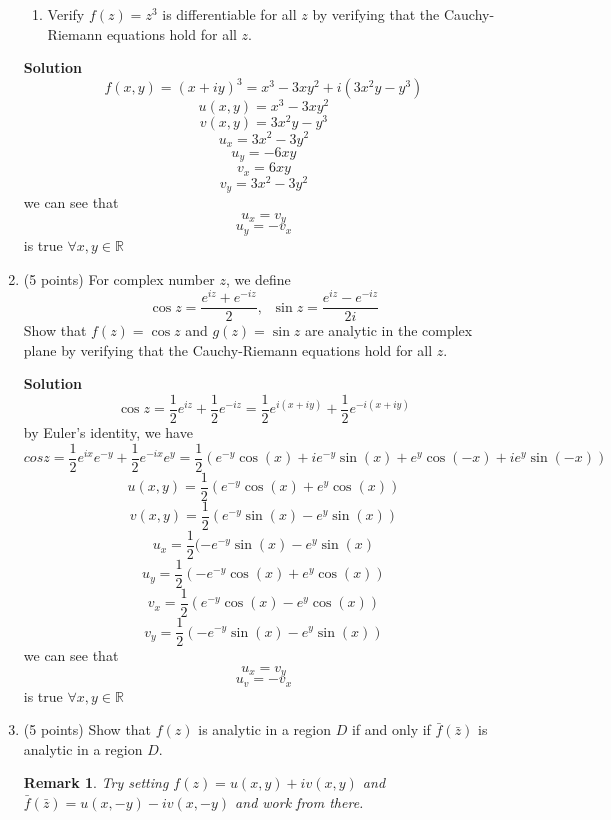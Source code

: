 \documentclass[12pt]{article}
\newtheorem*{remark}{Remark}
\begin{document}
\begin{enumerate}
\begin{enumerate}
    \item Verify $f(z) = z^{3}$ is differentiable for all $z$ by verifying that the Cauchy-Riemann equations hold for all $z$. 
\end{enumerate}
\textbf{Solution}
\[
f(x,y)=(x+iy)^3=x^3 - 3xy^2 + i(3x^2y - y^3)
\]
\[
u(x,y)=x^3-3xy^2
\]
\[
v(x,y)=3x^2y-y^3
\]
\[
u_x=3x^2-3y^2
\]
\[
u_y=-6xy
\]
\[
v_x=6xy
\]
\[
v_y=3x^2-3y^2
\]
we can see that\[
u_x=v_y
\]
\[
u_y=-v_x
\]
is true $\forall x,y\in \mathbb{R}$


\item (5 points) For complex number $z$, we define 
\[
\cos z = \frac{ e^{i z } + e^{-i z} }{2}, \; \; \sin z = \frac{ e^{i z } - e^{-i z } }{2i} 
\]
Show that $f(z) = \cos z$ and $ g(z) = \sin z$ are analytic in the complex plane by verifying that the Cauchy-Riemann equations hold for all $z$.  

\textbf{Solution}
\\
\[
\cos z = \frac{1}{2}e^{iz}+\frac{1}{2}e^{-iz}=\frac{1}{2}e^{i(x+iy)}+\frac{1}{2}e^{-i(x+iy)}
\]
by Euler's identity, we have
\[
cos z=\frac{1}{2}e^{ix}e^{-y}+\frac{1}{2}e^{-ix}e^{y}=\frac{1}{2}(e^{-y}\cos(x)+ie^{-y}\sin(x)+e^{y}\cos(-x)+ie^{y}\sin(-x))
\]
\[
u(x,y)=\frac{1}{2}(e^{-y}\cos(x)+e^{y}\cos(x))
\]
\[
v(x,y)=\frac{1}{2}(e^{-y}\sin(x)-e^{y}\sin(x))
\]
\[
u_x=\frac{1}{2}(-e^{-y}\sin(x)-e^{y}\sin(x)
\]
\[
u_y=\frac{1}{2}(-e^{-y}\cos(x)+e^{y}\cos(x))
\]
\[
v_x=\frac{1}{2}(e^{-y}\cos(x)-e^{y}\cos(x))
\]
\[
v_y=\frac{1}{2}(-e^{-y}\sin(x)-e^{y}\sin(x))
\]
we can see that\[
u_x=v_y
\]\[
u_v=-v_x
\]
is true $\forall x,y\in \mathbb{R}$


\item (5 points) Show that $f(z)$ is analytic in a region $D$ if and only if $\bar{f}(\bar{z})$ is analytic in a region $D$.  

\begin{remark}
   Try setting $f(z)  = u(x, y) + i v(x, y)$ and $\bar{f}(\bar{z})  = u(x, -y) -i v(x, -y)$ and work from there.   
\end{remark}


\end{enumerate}
\end{document}
